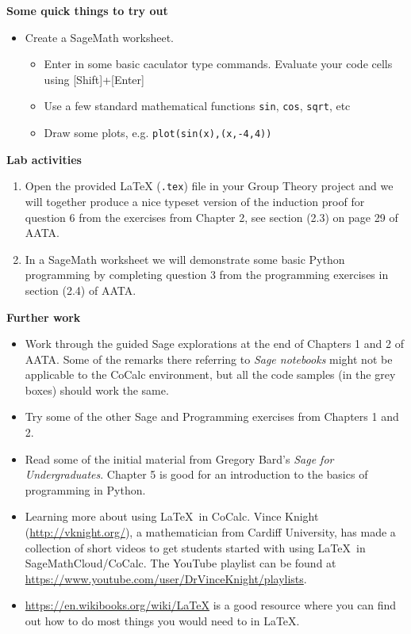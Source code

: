\documentclass[oneside,10pt]{amsart}
\newcommand{\cbox}[1]{\begin{tcolorbox}[left=0.5mm,right=0.5mm,top=0.5mm,bottom=0.5mm, boxsep=2pt, boxrule=0pt,colback=black]\color{white}\sffamily #1 \end{tcolorbox}}
\newcommand{\topic}[1]{\cbox{\textbf{#1}}\vskip 4pt}
\begin{document}
\topic{Some quick things to try out}

\begin{itemize}
\item
Create a SageMath worksheet.
\begin{itemize}
\item
Enter in some basic caculator type commands. Evaluate your code cells using [Shift]+[Enter]
\item
Use a few standard mathematical functions \texttt{sin}, \texttt{cos}, \texttt{sqrt}, etc
\item
Draw some plots, e.g. \texttt{plot(sin(x),(x,-4,4))}
\end{itemize}
\end{itemize}
\topic{Lab activities}
\begin{enumerate}
\item
Open the provided LaTeX (\texttt{.tex}) file in your Group Theory project and we will together produce a nice typeset version of the induction proof for question 6 from the exercises from Chapter 2, see section (2.3) on page 29 of AATA.
\item
In a SageMath worksheet we will demonstrate some basic Python programming by completing question 3 from the programming exercises in section (2.4) of AATA.
\end{enumerate}
\topic{Further work}
\begin{itemize}
\item
Work through the guided Sage explorations at the end of Chapters 1 and 2 of AATA. Some of the remarks there referring to \emph{Sage notebooks} might not be applicable to the CoCalc environment, but all the code samples (in the grey boxes) should work the same.
\item
Try some of the other Sage and Programming exercises from Chapters 1 and 2.
\item
Read some of the initial material from Gregory Bard's \emph{Sage for Undergraduates}. Chapter 5 is good for an introduction to the basics of programming in Python.
\item
Learning more about using \LaTeX\ in CoCalc. Vince Knight (\url{http://vknight.org/}), a mathematician from Cardiff University, has made a collection of short videos to get students started with using \LaTeX\ in SageMathCloud/CoCalc. The YouTube playlist can be found at \url{https://www.youtube.com/user/DrVinceKnight/playlists}.
\item
\url{https://en.wikibooks.org/wiki/LaTeX} is a good resource where you can find out how to do most things you would need to in \LaTeX.

\end{itemize}
\end{document}
